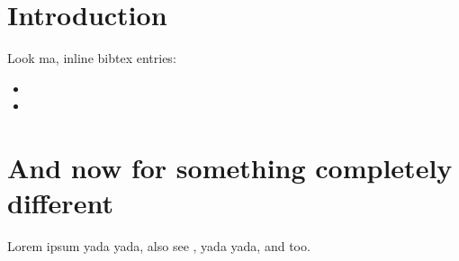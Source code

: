 \documentclass{article}
\begin{document}
\section{Introduction}

Look ma, inline bibtex entries:

\begin{itemize}
\item {}
\item {}
\end{itemize}

\section{And now for something completely different}
Lorem ipsum yada yada,
also see \cite{britney}, 
yada yada, and \cite{marilyn} too.



\end{document}
